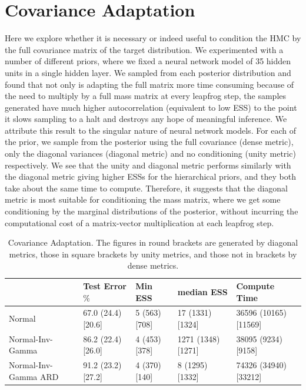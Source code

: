 \documentclass[12pt]{report}
\begin{document}
\section{Covariance Adaptation}
Here we explore whether it is necessary or indeed useful to condition the HMC by the full covariance matrix of the target distribution. 
We experimented with a number of different priors, where we fixed a neural network model of 35 hidden units in a single hidden layer. We sampled from each posterior distribution 
 and found that not only is adapting the full matrix more time consuming because of the need to multiply by a full mass matrix at every leapfrog step, the samples generated have much higher autocorrelation (equivalent to low ESS) to the point it slows sampling to a halt and destroys any hope of meaningful inference. We attribute this result to the singular nature of neural network models. For each of the prior, we sample from the posterior using the full covariance (dense metric), only the diagonal variances (diagonal metric) and no conditioning (unity metric) respectively. We see that the unity and diagonal metric performs similarly with the diagonal metric giving higher ESSs for the hierarchical priors, and they both take about the same time to compute. Therefore, it suggests that the diagonal metric is most suitable for conditioning the mass matrix, where we get some conditioning by the marginal distributions of the posterior, without incurring the computational cost of a matrix-vector multiplication at each leapfrog step.

\begin{table}[]
\footnotesize
\begin{tabular}{@{}lllll@{}}
\toprule
                     & Test Error$\%$ & Min ESS & median ESS & Compute Time \\ \midrule
Normal               & 67.0 (24.4) [20.6]   & 5 (563) [708] & 17 (1331) [1324]  & 36596 (10165) [11569]     \\ \midrule
Normal-Inv-Gamma     & 86.2 (22.4) [26.0]  & 4 (453) [378]  & 1271 (1348) [1271]    & 38095 (9234) [9158]     \\ \midrule
Normal-Inv-Gamma ARD & 91.2 (23.2) [27.2]  & 4 (370) [140]  & 8 (1295) [1332]    & 74326 (34940) [33212]     \\ \bottomrule
\end{tabular}
\caption{Covariance Adaptation. The figures in round brackets are generated by diagonal metrics, those in square brackets by unity metrics, and those not in brackets by dense metrics. }
\label{my-label}
\end{table}
\end{document}
